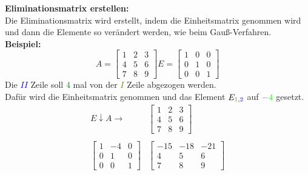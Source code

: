 \documentclass[12pt,a4paper]{article}
\begin{document}
\textbf{Eliminationsmatrix erstellen:} \\
Die Eliminationsmatrix wird erstellt, indem die Einheitsmatrix genommen wird und dann die Elemente so verändert werden, wie beim Gauß-Verfahren. \\
\textbf{Beispiel:}
\[
A =
\begin{bmatrix}
    1 & 2 & 3 \\
    4 & 5 & 6 \\
    7 & 8 & 9
\end{bmatrix}
E =
\begin{bmatrix}
1 & 0 & 0 \\
0 & 1 & 0 \\
0 & 0 & 1
\end{bmatrix}
\]
Die \textcolor{blue}{$II$} Zeile soll \textcolor{green}{$4$} mal von der \textcolor{olive}{$I$} Zeile abgezogen werden. \\
Dafür wird die Einheitsmatrix genommen und das Element $E_{\textcolor{olive}{1},\textcolor{blue}{2}}$ auf $\textcolor{green}{-4}$ gesetzt. \\
\[
\begin{matrix}
    E \downarrow A \rightarrow & \begin{bmatrix}
        1 & 2 & 3 \\
        4 & 5 & 6 \\
        7 & 8 & 9
    \end{bmatrix} \\ \\
    \begin{bmatrix}
        1 & -4 & 0 \\
        0 & 1 & 0 \\
        0 & 0 & 1
    \end{bmatrix} & \begin{bmatrix}
        -15 & -18 & -21 \\
        4 & 5 & 6 \\
        7 & 8 & 9
    \end{bmatrix}
\end{matrix}
\]
\end{document}
